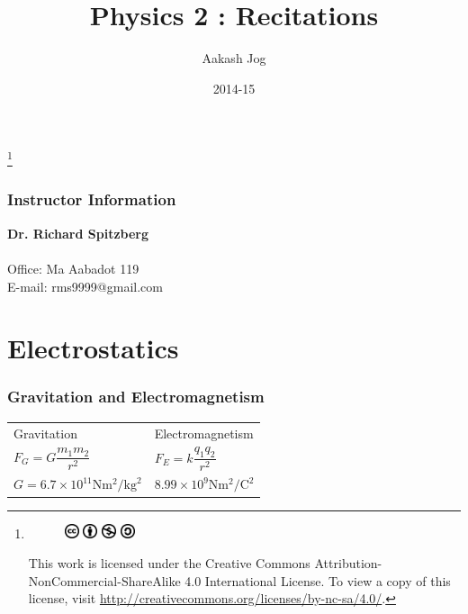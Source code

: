 \documentclass[fleqn, a4paper, 12pt, twoside]{article}
\title{Physics 2 : Recitations}
\author{Aakash Jog}
\date{2014-15}
\theoremstyle{definition}
\theoremstyle{theorem}
\newcommand\blfootnote[1]{%
	\begingroup
	\renewcommand\thefootnote{}\footnote{#1}%
	\addtocounter{footnote}{-1}%
	\endgroup
}
\begin{document}
\maketitle

\blfootnote
{	
	\begin{figure}[H]
		\includegraphics[height = 12pt]{cc.eps}
		\includegraphics[height = 12pt]{by.eps}
		\includegraphics[height = 12pt]{nc.eps}
		\includegraphics[height = 12pt]{sa.eps}
	\end{figure}
	This work is licensed under the Creative Commons Attribution-NonCommercial-ShareAlike 4.0 International License. To view a copy of this license, visit \url{http://creativecommons.org/licenses/by-nc-sa/4.0/}.
} %

\tableofcontents

\newpage
\section{Instructor Information}

\textbf{Dr. Richard Spitzberg}\\
~\\
Office: Ma Aabadot 119\\
E-mail: rms9999@gmail.com\\

\newpage

\part{Electrostatics}

\section{Gravitation and Electromagnetism}

\begin{tabular}{l l}
	Gravitation & Electromagnetism\\
		$F_G = G \dfrac{m_1 m_2}{r^2}$ & $F_E = k \dfrac{q_1 q_2}{r^2}$\\
		$G = 6.7 \times 10^{11} \si{\newton\metre\squared\per\kg\squared}$ & $8.99 \times 10^9 \si{\newton\metre\squared\per\coulomb\squared}$\\
\end{tabular}
\end{document}
